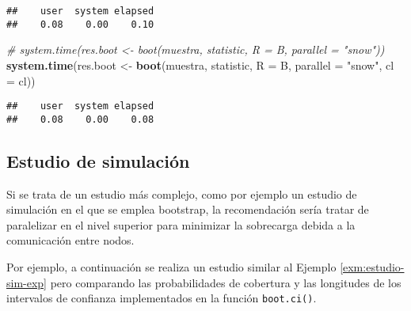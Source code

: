 \documentclass[
]{book}
\newenvironment{Shaded}{\begin{snugshade}}{\end{snugshade}}
\newcommand{\CommentTok}[1]{\textcolor[rgb]{0.56,0.35,0.01}{\textit{#1}}}
\newcommand{\DataTypeTok}[1]{\textcolor[rgb]{0.13,0.29,0.53}{#1}}
\newcommand{\KeywordTok}[1]{\textcolor[rgb]{0.13,0.29,0.53}{\textbf{#1}}}
\newcommand{\NormalTok}[1]{#1}
\newcommand{\StringTok}[1]{\textcolor[rgb]{0.31,0.60,0.02}{#1}}
\theoremstyle{definition}
\theoremstyle{definition}
\theoremstyle{definition}
\theoremstyle{remark}
\begin{document}
\begin{verbatim}
##    user  system elapsed 
##    0.08    0.00    0.10
\end{verbatim}

\begin{Shaded}
\begin{Highlighting}[]
\CommentTok{# system.time(res.boot <- boot(muestra, statistic, R = B, parallel = "snow"))}
\KeywordTok{system.time}\NormalTok{(res.boot <-}\StringTok{ }\KeywordTok{boot}\NormalTok{(muestra, statistic, }\DataTypeTok{R =}\NormalTok{ B, }\DataTypeTok{parallel =} \StringTok{"snow"}\NormalTok{, }\DataTypeTok{cl =}\NormalTok{ cl))}
\end{Highlighting}
\end{Shaded}

\begin{verbatim}
##    user  system elapsed 
##    0.08    0.00    0.08
\end{verbatim}

\hypertarget{estudio-de-simulaciuxf3n}{%
\subsection{Estudio de simulación}\label{estudio-de-simulaciuxf3n}}

Si se trata de un estudio más complejo, como por ejemplo un estudio de simulación
en el que se emplea bootstrap, la recomendación sería tratar de paralelizar
en el nivel superior para minimizar la sobrecarga debida a la comunicación
entre nodos.

Por ejemplo, a continuación se realiza un estudio similar al Ejemplo \ref{exm:estudio-sim-exp}
pero comparando las probabilidades de cobertura y las longitudes de los
intervalos de confianza implementados en la función \texttt{boot.ci()}.
\end{document}
